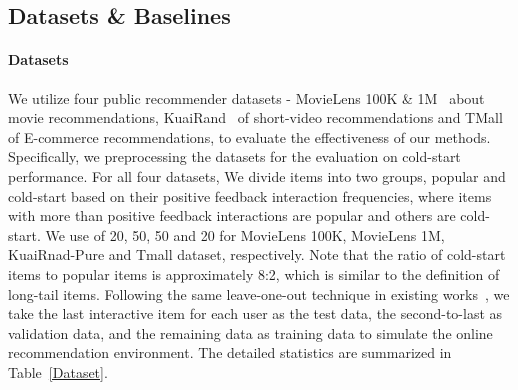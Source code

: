 \documentclass[sigconf]{acmart}
\begin{document}
\subsection{Datasets \& Baselines}
\paragraph{Datasets}
We utilize four public recommender datasets - MovieLens 100K \& 1M~\cite{harper2015movielens} about movie recommendations, KuaiRand~\cite{gao2022kuairand} of short-video recommendations and TMall~\cite{TMall} of E-commerce recommendations, to evaluate the effectiveness of our methods. 
Specifically, we preprocessing the datasets for the evaluation on cold-start performance. 
For all four datasets, We divide items into two groups, popular and cold-start based on their positive feedback interaction frequencies, where items with more than positive feedback interactions are popular and others are cold-start. We use of 20, 50, 50 and 20 for MovieLens 100K, MovieLens 1M, KuaiRnad-Pure and Tmall dataset, respectively. Note
that the ratio of cold-start items to  popular items is approximately 8:2, which
is similar to the definition of long-tail items.
Following the same leave-one-out technique in existing works~\cite{wu2024personalized,zhang2023empowering}, we  take the last interactive item for each user as the test data, the second-to-last as validation data, and the remaining data as training data to simulate the online recommendation environment. 
The detailed statistics are summarized in Table~\ref{Dataset}.
\begin{table}[t]
    \caption{Overview of the dataset.}
    \label{Dataset}
\end{table}
\end{document}
